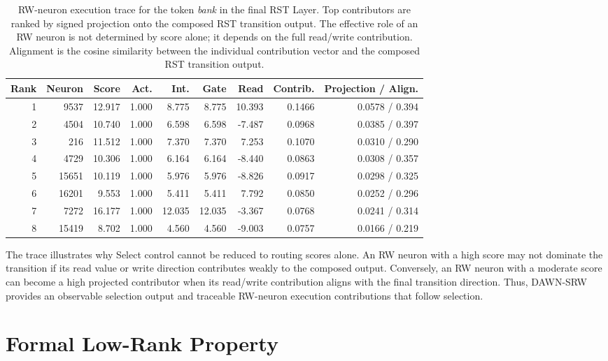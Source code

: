 \documentclass{article}
\begin{document}
\begin{table}[h]
\centering
\small
\setlength{\tabcolsep}{4pt}
\begin{tabular}{rrrrrrrrr}
\toprule
Rank & Neuron & Score & Act. & Int. & Gate & Read & Contrib. & Projection / Align. \\
\midrule
1 & 9537  & 12.917 & 1.000 & 8.775 & 8.775 & 10.393  & 0.1466 & 0.0578 / 0.394 \\
2 & 4504  & 10.740 & 1.000 & 6.598 & 6.598 & -7.487  & 0.0968 & 0.0385 / 0.397 \\
3 & 216   & 11.512 & 1.000 & 7.370 & 7.370 & 7.253   & 0.1070 & 0.0310 / 0.290 \\
4 & 4729  & 10.306 & 1.000 & 6.164 & 6.164 & -8.440  & 0.0863 & 0.0308 / 0.357 \\
5 & 15651 & 10.119 & 1.000 & 5.976 & 5.976 & -8.826  & 0.0917 & 0.0298 / 0.325 \\
6 & 16201 & 9.553  & 1.000 & 5.411 & 5.411 & 7.792   & 0.0850 & 0.0252 / 0.296 \\
7 & 7272  & 16.177 & 1.000 & 12.035& 12.035& -3.367  & 0.0768 & 0.0241 / 0.314 \\
8 & 15419 & 8.702  & 1.000 & 4.560 & 4.560 & -9.003  & 0.0757 & 0.0166 / 0.219 \\
\bottomrule
\end{tabular}
\caption{RW-neuron execution trace for the token \emph{bank} in the final RST Layer. Top contributors are ranked by signed projection onto the composed RST transition output. The effective role of an RW neuron is not determined by score alone; it depends on the full read/write contribution. Alignment is the cosine similarity between the individual contribution vector and the composed RST transition output.}
\label{tab:decision_trace}
\end{table}

The trace illustrates why Select control cannot be reduced to routing scores alone. An RW neuron with a high score may not dominate the transition if its read value or write direction contributes weakly to the composed output. Conversely, an RW neuron with a moderate score can become a high projected contributor when its read/write contribution aligns with the final transition direction. Thus, DAWN-SRW provides an observable selection output and traceable RW-neuron execution contributions that follow selection.

\section{Formal Low-Rank Property}
\label{app:rw_low_rank_property}
\end{document}
